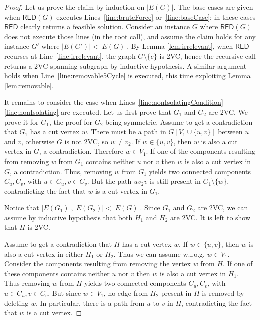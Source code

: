 \documentclass{theoretics}
\newcommand{\RED}{\mathsf{RED}}
\begin{document}
\begin{proof}
 Let us prove the claim by induction on $|E(G)|$. The base cases are given when $\RED(G)$ executes Lines~\ref{line:bruteForce} or~\ref{line:baseCase}: in these cases $\RED$ clearly returns a feasible solution. Consider an instance $G$ where $\RED(G)$ does not execute those lines (in the root call), and assume the claim holds for any instance $G'$ where $|E(G')| < |E(G)|$.
 By Lemma \ref{lem:irrelevant}, when $\RED$ recurses at  Line~\ref{line:irrelevant}, the graph $G\setminus \{e\}$ is 2VC, hence the recursive call returns a 2VC spanning subgraph by inductive hypothesis. A similar argument holds when Line~\ref{line:removable5Cycle} is executed, this time exploiting Lemma \ref{lem:removable}.

It remains to consider the case when Lines~\ref{line:nonIsolatingCondition}-\ref{line:nonIsolating} are executed. Let us first prove that $G_1$ and $G_2$ are 2VC. We prove it for $G_1$, the proof for $G_2$ being symmetric. Assume to get a contradiction that $G_1$ has a cut vertex $w$. There must be a path in $G[V_1\cup\{u, v\}]$ between $u$ and $v$, otherwise $G$ is not 2VC, so $w\neq v_2$. If $w\in \{u, v\}$, then $w$ is also a cut vertex in $G$, a contradiction. Therefore $w\in V_1$. If one of the components resulting from removing $w$ from $G_1$ contains neither $u$ nor $v$ then $w$ is also a cut vertex in $G$, a contradiction. Thus, removing $w$ from $G_1$ yields two connected components $C_u, C_v$, with $u\in C_u, v\in C_v$. But the path $uv_2v$ is still present in $G_1\setminus\{w\}$, contradicting the fact that $w$ is a cut vertex in $G_1$.

Notice that $|E(G_1)|, |E(G_2)| < |E(G)|$. Since $G_1$ and $G_2$ are 2VC, we can assume by inductive hypothesis that both $H_1$ and $H_2$ are 2VC. It is left to show that $H$ is 2VC.

Assume to get a contradiction that $H$ has a cut vertex $w$. If $w\in\{u, v\}$, then $w$ is also a cut vertex in either $H_1$ or $H_2$. Thus we can assume w.l.o.g. $w\in V_1$. Consider the components resulting from removing the vertex $w$ from $H$. If one of these components contains neither $u$ nor $v$ then $w$ is also a cut vertex in $H_1$. Thus removing $w$ from $H$ yields two connected components $C_u, C_v$, with $u\in C_u, v\in C_v$. But since $w\in V_1$, no edge from $H_2$ present in $H$ is removed by deleting $w$. In particular, there is a path from $u$ to $v$ in $H$, contradicting the fact that $w$ is a cut vertex.
\end{proof}
\end{document}
